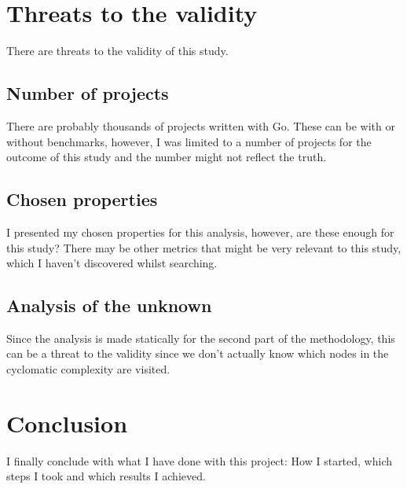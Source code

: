\documentclass{seal_thesis}
\begin{document}
\chapter{Threats to the validity}
There are threats to the validity of this study.

\section{Number of projects}
There are probably thousands of projects written with Go. These can be with or without benchmarks, however, I was limited to a number of projects for the outcome of this study and the number might not reflect the truth.

\section{Chosen properties}
I presented my chosen properties for this analysis, however, are these enough for this study? There may be other metrics that might be very relevant to this study, which I haven't discovered whilst searching.

\section{Analysis of the unknown}
Since the analysis is made statically for the second part of the methodology, this can be a threat to the validity since we don't actually know which nodes in the cyclomatic complexity are visited.

\chapter{Conclusion}
I finally conclude with what I have done with this project: How I started, which steps I took and which results I achieved.


\backmatter


\end{document}
